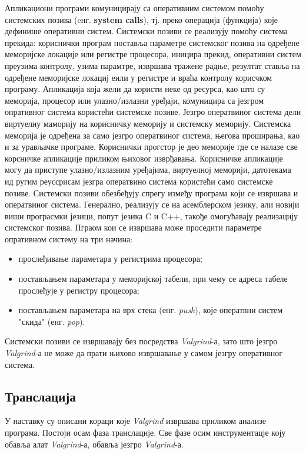 \documentclass[12pt,oneside]{memoir}
\begin{document}
\indent Апликациони програми комуницирају са оперативним системом помоћу системских позива (eнг. \textbf{system calls}), тј. преко операција (функција) које дефинише оперативни систем.
\indent Системски позиви се реализују помоћу система прекида: кориснички програм поставља параметре системског позива на одређене меморијске локације или регистре процесора, иницира прекид, оперативни систем преузима контролу, узима парамтре, извршава тражене радње, резултат ставља на одређене меморијске локациј еили у регистре и враћа контролу корисчком програму. 
\indent Апликација која жели да користи неке од ресурса, као што су меморија, процесор или улазно/излазни уређаји, комуницира са језгром опративног система користећи системске позиве. Језгро оператвиног система дели виртуелну маморију на корисничку меморију и системску меморију. Системска меморија је одређена за само језгро оператвиног система, његова проширања, као и за урављачке програме. Кориснички прогстор је део меморије где се налазе све корсничке апликације приликом њиховог изврђавања. Корисничке апликације могу да приступе улазно/излазним уређајима, виртуелној меморији, датотекама ид ругим реуссрисам језгра оператвино система користећи само системске позиве. Системски позиви обезбеђују спрегу између програма који се извршава и оператвиног система. Генерално, реализују се на асемблерском језику, али новији виши програсмки језици, попут језика C и C++, такође омогућавају реализацију системског позива. Пграом кои се извршава може проседити параметре опративном систему на три начина:
\begin{itemize}
  \item прослеђивање параметара у регистрима процесора;
  \item постављањем параметара у меморијској табели, при чему се адреса табеле прослеђује у регистру процесора;
  \item постављањем параметара на врх стека (енг. \textit{push}), које оператвни систем "скида" (енг. \textit{pop}).
\end{itemize}
\indent Системски позиви се извршавају без посредства \textit{Valgrind}-а, зато што језгро \textit{Valgrind}-а не може да прати њихово извршавање у самом језгру оперативног система.


\subsection{Транслација}

\indent У наставку су описани кораци које \textit{Valgrind} извршава приликом анализе програма. Постоји осам фаза транслације. Све фазе осим инструментацје коју обавља алат \textit{Valgrind}-а, обавља језгро \textit{Valgrind}-а.
\end{document}
